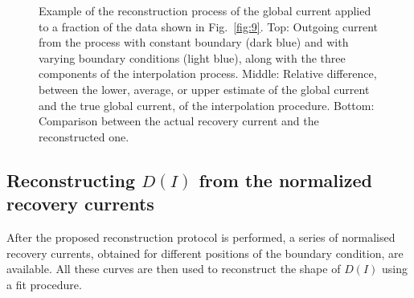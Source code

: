 {\begin{figure}[htp]
    \caption{Example of the reconstruction process of the global current applied to a fraction of the data shown in Fig.~\ref{fig:9}. Top: Outgoing current from the process with constant boundary (dark blue) and with varying boundary conditions (light blue), along with the three components of the interpolation process. Middle: Relative difference, between the lower, average, or upper estimate of the global current and the true global current, of the interpolation procedure. Bottom: Comparison between the actual recovery current and the reconstructed one.}
    \label{fig:protocol}
\end{figure}


\subsection{Reconstructing $D(I)$ from the normalized recovery currents}


After the proposed reconstruction protocol is performed, a series of normalised recovery currents, obtained for different positions of the boundary condition, are available. All these curves are then used to reconstruct the shape of $D(I)$ using a fit procedure.

}
